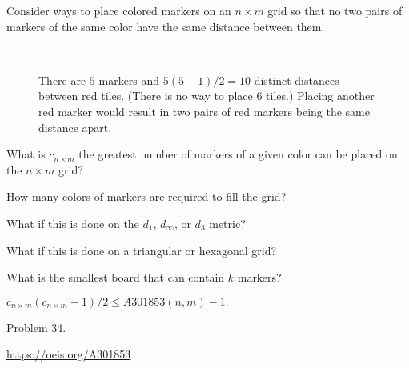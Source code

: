 \documentclass{article}
\begin{document}
Consider ways to place colored markers on an $n \times m$ grid so that no two
pairs of markers of the same color have the same distance between them.

\begin{figure}[!h]
  \centering
  \\
  \caption{
    There are $5$ markers and $5(5-1)/2 = 10$ distinct distances between red
    tiles. (There is no way to place $6$ tiles.)
    Placing another red marker would result in two pairs of red markers being
    the same distance apart.
  }
\end{figure}

\begin{question}
  What is $c_{n \times m}$ the greatest number of markers of a given color can
  be placed on the $n \times m$ grid?
\end{question}
\begin{related}
  \item How many colors of markers are required to fill the grid?
  \item What if this is done on the $d_1$, $d_\infty$, or $d_3$ metric?
  \item What if this is done on a triangular or hexagonal grid?
  \item What is the smallest board that can contain $k$ markers?
\end{related}
\begin{note}
  $c_{n \times m}(c_{n \times m}-1)/2 \leq A301853(n, m) - 1.$
\end{note}
\begin{references}
  \item Problem 34.
  \item \url{https://oeis.org/A301853}
\end{references}
\end{document}
